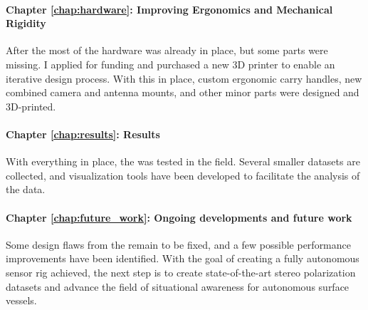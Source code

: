 \paragraph{Chapter \ref{chap:hardware}: Improving Ergonomics and Mechanical Rigidity}
After the \preproject most of the hardware was already in place, but some parts were missing.
I applied for funding and purchased a new 3D printer to enable an iterative design process.
With this in place, custom ergonomic carry handles, new combined camera and antenna mounts, and other minor parts were designed and 3D-printed.

\paragraph{Chapter \ref{chap:results}: Results}
With everything in place, the \sr was tested in the field.
Several smaller datasets are collected, and visualization tools have been developed to facilitate the analysis of the data.

\paragraph{Chapter \ref{chap:future_work}: Ongoing developments and future work}
Some design flaws from the \preproject remain to be fixed, and a few possible performance improvements have been identified.
With the goal of creating a fully autonomous sensor rig achieved, the next step is to create state-of-the-art stereo polarization datasets and advance the field of situational awareness for autonomous surface vessels.

